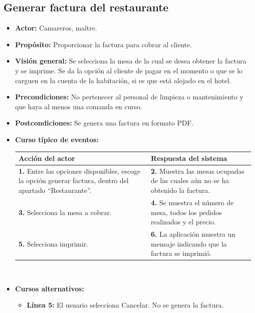 \documentclass[spanish,a4paper,11pt, twoside]{report}	%
\begin{document}

		\subsection{Generar factura del restaurante}
			\begin{itemize}
			\item \textbf{Actor:} Camareros, maître.
			\item \textbf{Propósito: } Proporcionar la factura para cobrar al cliente.
			\item \textbf{Visión general:} Se selecciona la mesa de la cual se desea obtener la factura y se imprime. Se da la opción al cliente de pagar en el momento o que se lo carguen en la cuenta de la habitación, si es que está alojado en el hotel.
			\item \textbf{Precondiciones:} No pertenecer al personal de limpieza o mantenimiento y que haya al menos una comanda en curso.
			\item \textbf{Postcondiciones:} Se genera una factura en formato PDF.
			\item \textbf{Curso típico de eventos:} 	\\
				\begin{tabular}{|p{6cm}||p{6cm}|}
				\hline
				\textbf{Acción del actor} & \textbf{Respuesta del sistema} \\ \hline \hline
				\textbf{1.} Entre las opciones disponibles, escoge la opción generar factura, 
					dentro del apartado ``Restaurante''. & 
				\textbf{2.} Muestra las mesas ocupadas de las cuales aún no se ha obtenido la factura. \\ \hline
				\textbf{3.} Selecciona la mesa a cobrar.	& 
				\textbf{4.} Se muestra el número de mesa, todos los pedidos realizados y el precio. \\ \hline
				\textbf{5.} Selecciona imprimir.	& 
				\textbf{6.} La aplicación muestra un mensaje indicando que la factura se imprimió. \\ \hline
			\end{tabular}
			\\
			\item \textbf{Cursos alternativos:} 
			\begin{itemize}
			\item  \textbf{Línea 5:} El usuario selecciona Cancelar. No se genera la factura.
			\end {itemize}
		\end {itemize}
		
\end{document}
